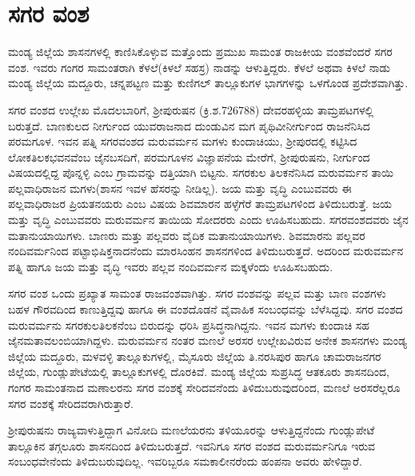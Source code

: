 \section{ಸಗರ ವಂಶ}

ಮಂಡ್ಯ ಜಿಲ್ಲೆಯ ಶಾಸನಗಳಲ್ಲಿ ಕಾಣಿಸಿಕೊಳ್ಳುವ ಮತ್ತೊಂದು ಪ್ರಮುಖ ಸಾಮಂತ ರಾಜಕೀಯ ವಂಶವೆಂದರೆ ಸಗರ ವಂಶ. ಇವರು ಗಂಗರ ಸಾಮಂತರಾಗಿ ಕೆಳಲೆ(ಕಿಳಲೆ ಸಹಸ್ರ) ನಾಡನ್ನು ಆಳುತ್ತಿದ್ದರು. ಕೆಳಲೆ ಅಥವಾ ಕಿಳಲೆ ನಾಡು ಮಂಡ್ಯ ಜಿಲ್ಲೆಯ ಮದ್ದೂರು, ಚನ್ನಪಟ್ಟಣ ಮತ್ತು ಕುಣಿಗಲ್​ ತಾಲ್ಲೂಕುಗಳ ಭಾಗಗಳನ್ನು ಒಳಗೊಂಡ ಪ್ರದೇಶವಾಗಿತ್ತು.

ಸಗರ ವಂಶದ ಉಲ್ಲೇಖ ಮೊದಲಬಾರಿಗೆ, ಶ‍್ರೀಪುರುಷನ (ಕ್ರಿ.ಶ.726\enginline{-}788) ದೇವರಹಳ್ಳಿಯ ತಾಮ್ರಪಟಗಳಲ್ಲಿ ಬರುತ್ತದೆ. ಬಾಣಕುಲದ ನೀರ್ಗುಂದ ಯುವರಾಜನಾದ ದುಂಡುವಿನ ಮಗ ಪೃಥಿವೀನೀರ್ಗುಂದ ರಾಜನೆನಿಸಿದ ಪರಮಗೂಳ. ಇವನ ಪತ್ನಿ ಸಗರವಂಶದ ಮರುವರ್ಮನ ಮಗಳು ಕುಂದಾಚಿಯು, ಶ‍್ರೀಪುರದಲ್ಲಿ ಕಟ್ಟಿಸಿದ ಲೋಕತಿಲಕಭವನವೆಂಬ ಜೈನಬಸದಿಗೆ, ಪರಮಗೂಳನ ವಿಜ್ಞಾಪನೆಯ ಮೇರೆಗೆ, ಶ‍್ರೀಪುರುಷನು, ನೀರ್ಗುಂದ ವಿಷಯದಲ್ಲಿದ್ದ ಪೊನ್ನಳ್ಳಿ ಎಂಬ ಗ್ರಾಮವನ್ನು ದತ್ತಿಯಾಗಿ ಬಿಟ್ಟನು. ಸಗರಕುಲ ತಿಲಕನೆನಿಸಿದ ಮರುವರ್ಮನ ತಾಯಿ ಪಲ್ಲವಾಧಿರಾಜನ ಮಗಳು(ಶಾಸನ ಇವಳ ಹೆಸರನ್ನು ನೀಡಿಲ್ಲ). ಜಯ ಮತ್ತು ವೃದ್ಧಿ ಎಂಬುವವರು ಈ ಪಲ್ಲವಾಧಿರಾಜರ ಪ್ರಿಯತನಯರು ಎಂಬ ವಿಷಯ ಶಿವಮಾರನ ಹಳ್ಳೆಗೆರೆ ತಾಮ್ರಪಟಗಳಿಂದ ತಿಳಿದುಬರುತ್ತೆ. ಜಯ ಮತ್ತು ವೃದ್ಧಿ ಎಂಬುವವರು ಮರುವರ್ಮನ ತಾಯಿಯ ಸೋದರರು ಎಂದು ಊಹಿಸಬಹುದು. ಸಗರವಂಶದವರು ಜೈನ ಮತಾನುಯಾಯಿಗಳು. ಬಾಣರು ಮತ್ತು ಪಲ್ಲವರು ವೈದಿಕ ಮತಾನುಯಾಯಿಗಳು. ಶಿವಮಾರನು ಪಲ್ಲವರ ನಂದಿವರ್ಮನಿಂದ ಪಟ್ಟಾಭಿಷಿಕ್ತನಾದನೆಂದು ಮಾರಸಿಂಹನ ಶಾಸನಗಳಿಂದ ತಿಳಿದುಬರುತ್ತದೆ. ಅದರಿಂದ ಮರುವರ್ಮನ ಪತ್ನಿ ಹಾಗೂ ಜಯ ಮತ್ತು ವೃದ್ಧಿ ಇವರು ಪಲ್ಲವ ನಂದಿವರ್ಮನ ಮಕ್ಕಳೆಂದು ಊಹಿಸಬಹುದು.

ಸಗರ ವಂಶ ಒಂದು ಪ್ರಖ್ಯಾತ ಸಾಮಂತ ರಾಜವಂಶವಾಗಿತ್ತು. ಸಗರ ವಂಶವನ್ನು ಪಲ್ಲವ ಮತ್ತು ಬಾಣ ವಂಶಗಳು ಬಹಳ ಗೌರವದಿಂದ ಕಾಣುತ್ತಿದ್ದವು ಹಾಗೂ ಈ ವಂಶದೊಡನೆ ವೈವಾಹಿಕ ಸಂಬಂಧವನ್ನು ಬೆಳೆಸಿದ್ದವು. ಸಗರ ವಂಶದ ಮರುವರ್ಮನು ಸಗರಕುಲತಿಲಕನೆಂಬ ಬಿರುದನ್ನು ಧರಿಸಿ ಪ್ರಸಿದ್ಧನಾಗಿದ್ದನು. ಇವನ ಮಗಳು ಕುಂದಾಚಿ ಸಹ ಜೈನಮತಾವಲಂಬಿಯಾಗಿದ್ದಳು. ಮರುವರ್ಮನ ನಂತರ ಮಣಲೆ ಅರಸರ ಉಲ್ಲೇಖವಿರುವ ಅನೇಕ ಶಾಸನಗಳು ಮಂಡ್ಯ ಜಿಲ್ಲೆಯ ಮದ್ದೂರು, ಮಳವಳ್ಳಿ ತಾಲ್ಲೂಕುಗಳಲ್ಲಿ, ಮೈಸೂರು ಜಿಲ್ಲೆಯ ತಿ.ನರಸಿಪುರ ಹಾಗೂ ಚಾಮರಾಜನಗರ ಜಿಲ್ಲೆಯ, ಗುಂಡ್ಲುಪೇಟೆಯಲ್ಲಿ ತಾಲ್ಲೂಕುಗಳಲ್ಲಿ ದೊರಕಿವೆ. ಮಂಡ್ಯ ಜಿಲ್ಲೆಯ ಸುಪ್ರಸಿದ್ಧ ಆತಕೂರು ಶಾಸನದಿಂದ, ಗಂಗರ ಸಾಮಂತನಾದ ಮಣಾಲರನು ಸಗರ ವಂಶಕ್ಕೆ ಸೇರಿದವನೆಂದು ತಿಳಿದುಬರುವುದರಿಂದ, ಮಣಲೆ ಅರಸರೆಲ್ಲರೂ ಸಗರ ವಂಶಕ್ಕೆ ಸೇರಿದವರಾಗಿರುತ್ತಾರೆ.

ಶ‍್ರೀಪುರುಷನು ರಾಜ್ಯವಾಳುತ್ತಿದ್ದಾಗ ವಿನೋದಿ ಮಣಲೆಯರನು ತಳಿಯೂರನ್ನು ಆಳುತ್ತಿದ್ದನೆಂದು ಗುಂಡ್ಲುಪೇಟೆ ತಾಲ್ಲೂಕಿನ ತಗ್ಗಲೂರು ಶಾಸನದಿಂದ ತಿಳಿದುಬರುತ್ತದೆ. ಇವನಿಗೂ ಸಗರ ವಂಶದ ಮರುವರ್ಮನಿಗೂ ಇರುವ ಸಂಬಂಧವೇನೆಂದು ತಿಳಿದುಬರುವುದಿಲ್ಲ. ಇವರಿಬ್ಬರೂ ಸಮಕಾಲೀನರೆಂದು ಹಂಪನಾ ಅವರು ಹೇಳಿದ್ದಾರೆ.

